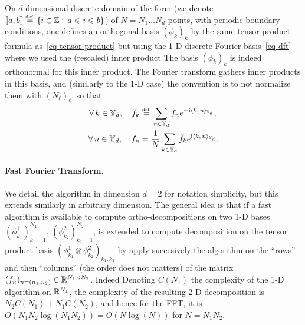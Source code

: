 On $d$-dimensional discrete domain of the form
(we denote $\llbracket a,b\rrbracket \stackrel{\mbox{\upshape\tiny def.}}{=} \left\{ i \in \mathbb{Z} \;;\; a \leqslant i \leqslant b \right\}$)
of $N=N_1\ldots N_d$ points, with periodic boundary conditions, one defines an orthogonal basis $(\phi_k)_k$ by the same tensor product formula as~\eqref{eq-tensor-product} but using the 1-D discrete Fourier basis~\eqref{eq-dft}
where we used the (rescaled) inner product
The basis $(\phi_k)_k$ is indeed orthonormal for this inner product. The Fourier transform gathers inner products in this basis, and (similarly to the 1-D case) the convention is to not normalize them with $(N_\ell)_\ell$, so that 
\begin{align*}
	\forall \, k \in \mathbb{Y}_d, \quad 
	\hat f_k &\stackrel{\mbox{\upshape\tiny def.}}{=} \sum_{n \in \mathbb{Y}_d} f_n e^{ -\mathrm{i} \langle k,\,n\rangle_{\mathbb{Y}_d} }, \\
	\forall \, n \in \mathbb{Y}_d, \quad 
	f_n &= \frac{1}{N} \sum_{k \in \mathbb{Y}_d} \hat f_k e^{ \mathrm{i} \langle k,\,n\rangle_{\mathbb{Y}_d} }.
\end{align*}



\paragraph{Fast Fourier Transform.}

We detail the algorithm in dimension $d=2$ for notation simplicity, but this extends similarly in arbitrary dimension. 
%
The general idea is that if a fast algorithm is available to compute ortho-decompositions on two 1-D bases $(\phi_{k_1}^{1})_{k_1=1}^{N_1}$, $(\phi_{k_2}^{2})_{k_2=1}^{N_2}$, is extended to compute decomposition on the tensor product basis 
$(\phi_{k_1}^{1} \otimes \phi_{k_2}^{2})_{k_1,k_2}$ by apply succesively the algorithm on the ``rows'' and then ``columns'' (the order does not matters) of the matrix $(f_n)_{n=(n_1,n_2)} \in \mathbb{R}^{N_1 \times N_2}$. 
%
Indeed
Denoting $C(N_1)$ the complexity of the 1-D algorithm on $\mathbb{R}^{N_1}$, the complexity of the resulting 2-D decomposition is $N_2 C(N_1)+N_1 C(N_2)$, and hence for the FFT, it is $O(N_1 N_2 \log(N_1 N_2))=O(N \log(N))$ for $N=N_1 N_2$.

